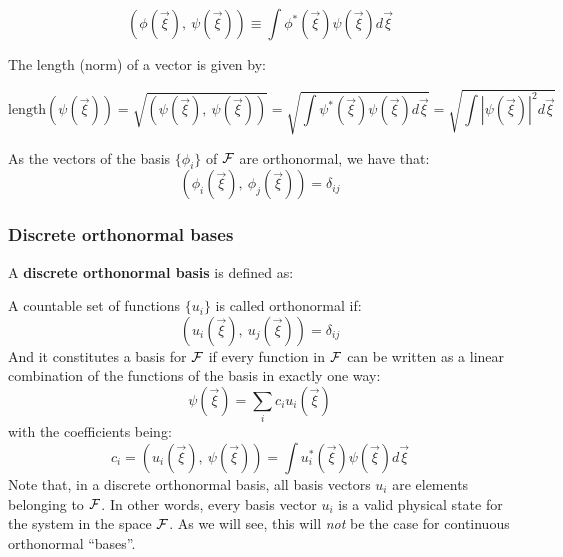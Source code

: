 \begin{equation}
    \left(\phi(\vec{\xi}), \ \psi(\vec{\xi})\right) \equiv \int\phi^*(\vec{\xi})\psi(\vec{\xi})d\vec{\xi}
\end{equation}

The length (norm) of a vector is given by:

\begin{equation}
    \text{length}\left(\psi(\vec{\xi})\right)=\sqrt{\left(\psi(\vec{\xi}), \ \psi(\vec{\xi})\right)} = \sqrt{\int\psi^*(\vec{\xi})\psi(\vec{\xi})d\vec{\xi}} = \sqrt{\int\left|\psi(\vec{\xi}) \right|^2d\vec{\xi}}
\end{equation}

As the vectors of the basis $\{\phi_i\}$ of $\mathcal{F}$ are orthonormal, we have that:
\begin{equation}
    \left(\phi_i(\vec{\xi}), \ \phi_j(\vec{\xi})\right) = \delta_{ij}
\end{equation}

\subsubsection{Discrete orthonormal bases}

A \textbf{discrete orthonormal basis} is defined as:

\begin{definition}
    A countable set of functions $\{u_i\}$ is called orthonormal if:
    \begin{equation}
        \left(u_i(\vec{\xi}), \ u_j(\vec{\xi})\right) = \delta_{ij}
    \end{equation}
    And it constitutes a basis for $\mathcal{F}$ if every function in $\mathcal{F}$ can be written as a linear combination of the functions of the basis in exactly one way:
    \begin{equation}
        \psi(\vec{\xi}) = \sum_i c_i u_i(\vec{\xi})
    \end{equation}
    with the coefficients being:
    \begin{equation}
        c_i = \left(u_i(\vec{\xi}), \ \psi(\vec{\xi})\right) = \int u_i^*(\vec{\xi})\psi(\vec{\xi})d\vec{\xi}
    \end{equation}    
    Note that, in a discrete orthonormal basis, all basis vectors $u_i$ are elements belonging to $\mathcal{F}$. In other words, every basis vector $u_i$ is a valid physical state for the system in the space $\mathcal{F}$. As we will see, this will \textit{not} be the case for continuous orthonormal ``bases''.
\end{definition}

